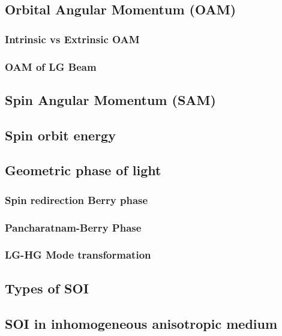 \documentclass[11pt,a4paper]{article}
\begin{document}
\subsection{Orbital Angular Momentum (OAM)}
\subsubsection{Intrinsic vs Extrinsic OAM}

\subsubsection{OAM of LG Beam}

\subsection{Spin Angular Momentum (SAM)}

\subsection{Spin orbit energy}

\subsection{Geometric phase of light}
\subsubsection{Spin redirection Berry phase}

\subsubsection{Pancharatnam-Berry Phase}

\subsubsection{LG-HG Mode transformation}

\subsection{Types of SOI}

\subsection{SOI in inhomogeneous anisotropic medium}
\end{document}
